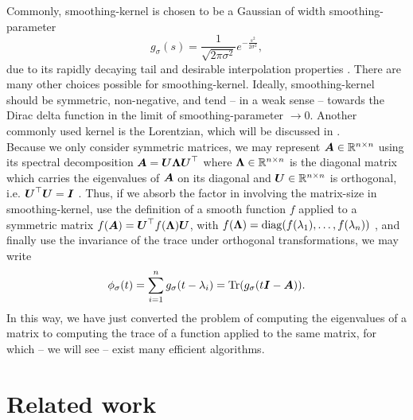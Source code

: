Commonly, \gls{smoothing-kernel} is chosen to be a Gaussian of width \gls{smoothing-parameter}
\begin{equation}
    g_{\sigma}(s) = \frac{1}{\sqrt{2 \pi \sigma^2}} e^{-\frac{s^2}{2\sigma^2}},
    \label{equ:1-introduction-def-gaussian-kernel}
\end{equation}
due to its rapidly decaying tail and desirable interpolation properties \cite{lin2017randomized}.
There are many other choices possible for \gls{smoothing-kernel}. Ideally,
\gls{smoothing-kernel} should be symmetric, non-negative, and tend -- in a weak sense --
towards the Dirac delta function in the limit of \gls{smoothing-parameter} $\to 0$. Another
commonly used kernel is the Lorentzian, which will be discussed in .\\

Because we only consider symmetric matrices, 
we may represent $\boldsymbol{A} \in \mathbb{R}^{n \times n}$ using its spectral
decomposition $\boldsymbol{A} = \boldsymbol{U} \boldsymbol{\Lambda} \boldsymbol{U}^{\top}$ where
$\boldsymbol{\Lambda} \in \mathbb{R}^{n \times n}$ is the diagonal matrix which carries
the eigenvalues of $\boldsymbol{A}$ on its diagonal and $\boldsymbol{U} \in \mathbb{R}^{n \times n}$
is orthogonal, i.e. $\boldsymbol{U}^{\top} \boldsymbol{U} = \boldsymbol{I}$ \cite[theorem~4.1.5]{horn1985matrix}.
Thus, if we absorb the factor in 
involving the \gls{matrix-size} in \gls{smoothing-kernel},
use the definition of a smooth function $f$ applied to a symmetric matrix
$f(\boldsymbol{A}) = \boldsymbol{U}^{\top} f(\boldsymbol{\Lambda}) \boldsymbol{U}$,
with $f(\boldsymbol{\Lambda}) = \operatorname{diag}(f(\lambda_1), \dots, f(\lambda_n))$ \cite[definition~1.2]{higham2008functions},
and finally use the invariance of the trace under orthogonal transformations, we may write
\begin{equation}
    \phi_{\sigma}(t) = \sum_{i=1}^n g_{\sigma}(t - \lambda_i) = \operatorname{Tr}(g_{\sigma}(t\boldsymbol{I} - \boldsymbol{A})).
    \label{equ:1-introduction-spectral-density-as-trace}
\end{equation}
In this way, we have just converted the problem of computing the eigenvalues of
a matrix to computing the trace of a function applied to the same matrix,
for which -- we will see -- exist many efficient algorithms.


\section{Related work}
\label{sec:1-introduction-related}

